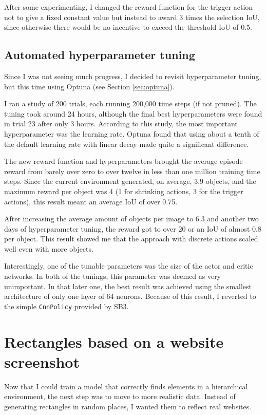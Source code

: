 \documentclass[
  digital,     %
  oneside,     %
  nosansbold,  %
  nocolorbold, %
  lof,         %
  lot,         %
]{fithesis4}
\begin{document}
After some experimenting, I changed the reward function for the trigger action not to give a fixed constant value but instead to award 3 times the selection IoU, since otherwise there would be no incentive to exceed the threshold IoU of 0.5.

\subsection{Automated hyperparameter tuning}

Since I was not seeing much progress, I decided to revisit hyperparameter tuning, but this time using Optuna (see Section \ref{sec:optuna}).

I ran a study of 200 trials, each running 200,000 time steps (if not pruned). The tuning took around 24 hours, although the final best hyperparameters were found in trial 23 after only 3 hours. According to this study, the most important hyperparameter was the learning rate. Optuna found that using about a tenth of the default learning rate with linear decay made quite a significant difference.

The new reward function and hyperparameters brought the average episode reward from barely over zero to over twelve in less than one million training time steps. Since the current environment generated, on average, 3.9 objects, and the maximum reward per object was 4 (1 for shrinking actions, 3 for the trigger actions), this result meant an average IoU of over 0.75.

After increasing the average amount of objects per image to 6.3 and another two days of hyperparameter tuning, the reward got to over 20 or an IoU of almost 0.8 per object. This result showed me that the approach with discrete actions scaled well even with more objects.

Interestingly, one of the tunable parameters was the size of the actor and critic networks. In both of the tunings, this parameter was deemed as very unimportant. In that later one, the best result was achieved using the smallest architecture of only one layer of 64 neurons. Because of this result, I reverted to the simple \texttt{CnnPolicy} provided by SB3.

\section{Rectangles based on a website screenshot}

Now that I could train a model that correctly finds elements in a hierarchical environment, the next step was to move to more realistic data. Instead of generating rectangles in random places, I wanted them to reflect real websites.
\end{document}
